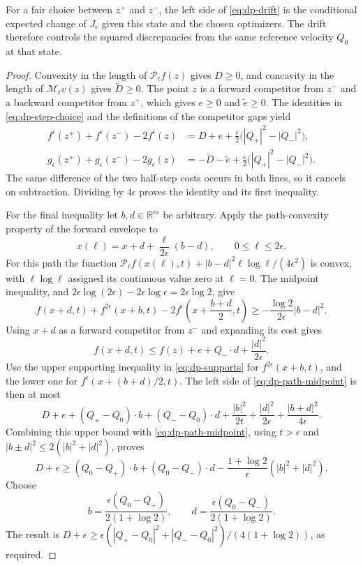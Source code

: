 \documentclass[11pt]{article}
\numberwithin{equation}{section}
\theoremstyle{definition}
\theoremstyle{remark}
\newcommand{\R}{\mathbb{R}}
\newcommand{\Penv}{\mathcal{P}}
\newcommand{\Menv}{\mathcal{M}}
\begin{document}
For a fair choice between $z^+$ and $z^-$, the left side of
\eqref{eq:dp-drift} is the conditional expected change of $J_\epsilon$
given this state and the chosen optimizers.
The drift therefore controls the squared discrepancies from the same
reference velocity $Q_0$ at that state.

\begin{proof}
Convexity in the length of $\Penv_\ell f(z)$ gives $D\ge0$, and concavity
in the length of $\Menv_\ell v(z)$ gives $\widetilde D\ge0$.  The point $z$
is a forward competitor from $z^-$ and a backward competitor from $z^+$,
which gives $e\ge0$ and $\widetilde e\ge0$.  The identities in
\eqref{eq:dp-step-choice} and the definitions of the competitor gaps yield
\begin{align*}
  f^\epsilon(z^+)+f^\epsilon(z^-)-2f^\epsilon(z)
    &=D+e+\frac{\epsilon}{2}\bigl(|Q_+|^2-|Q_-|^2\bigr),\\
  g_\epsilon(z^+)+g_\epsilon(z^-)-2g_\epsilon(z)
    &=-\widetilde D-\widetilde e
       +\frac{\epsilon}{2}\bigl(|Q_+|^2-|Q_-|^2\bigr).
\end{align*}
The same difference of the two half-step costs occurs in both lines, so it
cancels on subtraction.  Dividing by $4\epsilon$ proves the identity and
its first inequality.

For the final inequality let $b,d\in\R^m$ be arbitrary.  Apply the
path-convexity property of the forward envelope to
\[
  x(\ell)=x+d+\frac{\ell}{2\epsilon}(b-d),\qquad 0\le\ell\le2\epsilon.
\]
For this path the function
$\Penv_\ell f(x(\ell),t)+|b-d|^2\ell\log\ell/(4\epsilon^2)$ is convex,
with $\ell\log\ell$ assigned its continuous value zero at $\ell=0$.
The midpoint inequality, and
$2\epsilon\log(2\epsilon)-2\epsilon\log\epsilon=2\epsilon\log2$, give
\begin{equation}\label{eq:dp-path-midpoint}
  f(x+d,t)+f^{2\epsilon}(x+b,t)
    -2f^\epsilon\left(x+\frac{b+d}{2},t\right)
  \ge-\frac{\log2}{2\epsilon}|b-d|^2.
\end{equation}
Using $x+d$ as a forward competitor from $z^-$ and expanding its cost gives
\[
  f(x+d,t)\le f(z)+e+Q_-\cdot d+\frac{|d|^2}{2\epsilon}.
\]
Use the upper supporting inequality in \eqref{eq:dp-supports} for
$f^{2\epsilon}(x+b,t)$, and the lower one for
$f^\epsilon(x+(b+d)/2,t)$.  The left side of
\eqref{eq:dp-path-midpoint} is then at most
\[
  D+e+(Q_+-Q_0)\cdot b+(Q_--Q_0)\cdot d
       +\frac{|b|^2}{2t}+\frac{|d|^2}{2\epsilon}
       +\frac{|b+d|^2}{4\epsilon}.
\]
Combining this upper bound with \eqref{eq:dp-path-midpoint}, using
$t>\epsilon$ and $|b\pm d|^2\le2(|b|^2+|d|^2)$, proves
\[
  D+e\ge (Q_0-Q_+)\cdot b+(Q_0-Q_-)\cdot d
            -\frac{1+\log2}{\epsilon}(|b|^2+|d|^2).
\]
Choose
\[
  b=\frac{\epsilon(Q_0-Q_+)}{2(1+\log2)},\qquad
  d=\frac{\epsilon(Q_0-Q_-)}{2(1+\log2)}.
\]
The result is
$D+e\ge\epsilon(|Q_+-Q_0|^2+|Q_--Q_0|^2)/(4(1+\log2))$, as required.
\end{proof}
\end{document}
